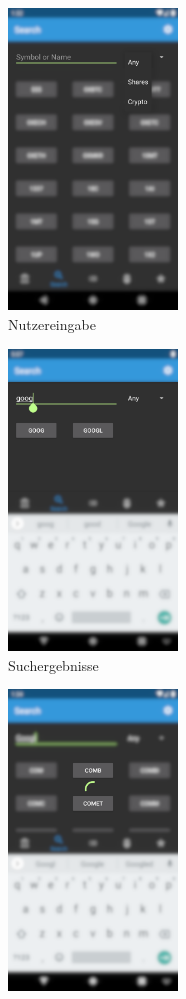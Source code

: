 \documentclass[a4paper]{article}
\begin{document}
\begin{figure}[H]
	\begin{subfigure}{.5\textwidth}
		\centering
		\includegraphics[height=8cm,keepaspectratio]{./images/search/type.png}
		\caption{Nutzereingabe}
		\label{fig:functionality:search:full}
	\end{subfigure}
	\begin{subfigure}{.5\textwidth}
		\centering
		\includegraphics[height=8cm,keepaspectratio]{./images/search/done.png}
		\caption{Suchergebnisse}
		\label{fig:functionality:search:results}
	\end{subfigure}
	\begin{subfigure}{.5\textwidth}
		\centering
		\includegraphics[height=8cm,keepaspectratio]{./images/search/loading.png}

\end{subfigure}
\end{figure}
\end{document}
